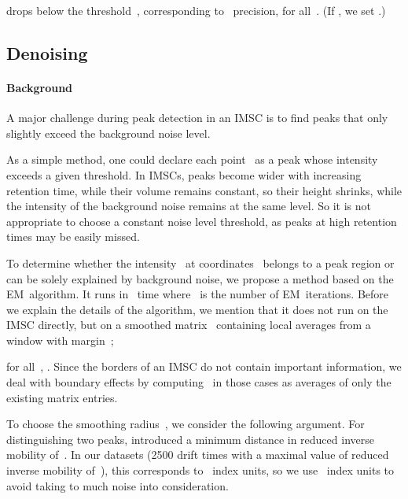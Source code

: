 \documentclass{article}
\begin{document}
drops below the threshold~, corresponding to~ precision, for all~.
(If , we set .)

\subsection{Denoising}
\label{sec:denoising}

\paragraph*{Background}
A major challenge during peak detection in an IMSC is to find peaks that only slightly exceed the background noise level.

As a simple method, one could declare each point~ as a peak whose intensity~ exceeds a given threshold.
In IMSCs, peaks become wider with increasing retention time, while their volume remains constant, so their height shrinks, while the intensity of the background noise remains at the same level.
So it is not appropriate to choose a constant noise level threshold, as peaks at high retention times may be easily missed.

To determine whether the intensity~ at coordinates~ belongs to a peak region or can be solely explained by background noise, we propose a method based on the EM~algorithm.
It runs in~ time where~ is the number of EM~iterations.
Before we explain the details of the algorithm, we mention that it does not run on the IMSC directly, but on a smoothed matrix~ containing local averages from a window with margin~;

for all~, .
Since the borders of an IMSC do not contain important information, we deal with boundary effects by computing~ in those cases as averages of only the existing matrix entries.

To choose the smoothing radius~, we consider the following argument.
For distinguishing two peaks, \cite{bodeker2008peak} introduced a minimum distance in reduced inverse mobility of~.
In our datasets (2500 drift times with a maximal value of reduced inverse mobility of~), this corresponds to~ index units, so we use~ index units to avoid taking to much noise into consideration.
\end{document}
